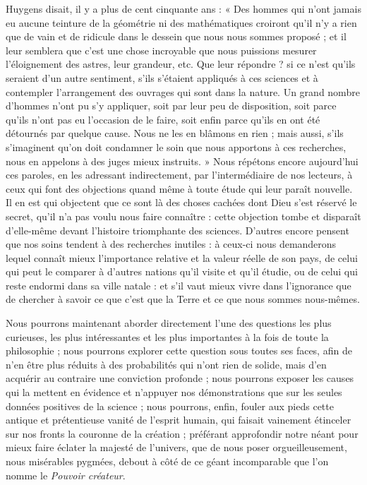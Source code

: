\documentclass[a4paper, 11pt, oneside]{article}
\begin{document}
Huygens disait, il y a plus de cent cinquante ans : « Des hommes qui n'ont jamais eu aucune teinture de la géométrie ni des mathématiques croiront qu'il n'y a rien que de vain et de ridicule dans le dessein que nous nous sommes proposé ; et il leur semblera que c'est une chose incroyable que nous puissions mesurer l'éloignement des astres, leur grandeur, etc. Que leur répondre ? si ce n'est qu'ils seraient d'un autre sentiment, s'ils s'étaient appliqués à ces sciences et à contempler l'arrangement des ouvrages qui sont dans la nature. Un grand nombre d'hommes n'ont pu s'y appliquer, soit par leur peu de disposition, soit parce qu'ils n'ont pas eu l'occasion de le faire, soit enfin parce qu'ils en ont été détournés par quelque cause. Nous ne les en blâmons en rien ; mais aussi, s'ils s'imaginent qu'on doit condamner le soin que nous apportons à ces recherches, nous en appelons à des juges mieux instruits. » Nous répétons encore aujourd'hui ces paroles, en les adressant indirectement, par l'intermédiaire de nos lecteurs, à ceux qui font des objections quand même à toute étude qui leur paraît nouvelle. Il en est qui objectent que ce sont là des choses cachées dont Dieu s'est réservé le secret, qu'il n'a pas voulu nous faire connaître : cette objection tombe et disparaît d'elle-même devant l'histoire triomphante des sciences. D'autres encore pensent que nos soins tendent à des recherches inutiles : à ceux-ci nous demanderons lequel connaît mieux l'importance relative et la valeur réelle de son pays, de celui qui peut le comparer à d'autres nations qu'il visite et qu'il étudie, ou de celui qui reste endormi dans sa ville natale : et s'il vaut mieux vivre dans l'ignorance que de chercher à savoir ce que c'est que la Terre et ce que nous sommes nous-mêmes.

Nous pourrons maintenant aborder directement l'une des questions les plus curieuses, les plus intéressantes et les plus importantes à la fois de toute la philosophie ; nous pourrons explorer cette question sous toutes ses faces, afin de n'en être plus réduits à des probabilités qui n'ont rien de solide, mais d'en acquérir au contraire une conviction profonde ; nous pourrons exposer les causes qui la mettent en évidence et n'appuyer nos démonstrations que sur les seules données positives de la science ; nous pourrons, enfin, fouler aux pieds cette antique et prétentieuse vanité de l'esprit humain, qui faisait vainement étinceler sur nos fronts la couronne de la création ; préférant approfondir notre néant pour mieux faire éclater la majesté de l'univers, que de nous poser orgueilleusement, nous misérables pygmées, debout à côté de ce géant incomparable que l'on nomme le \emph{Pouvoir créateur}.
\end{document}
